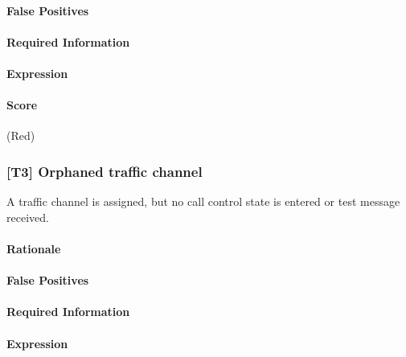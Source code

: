 \documentclass[a4paper,11pt,notitlepage,bigheadings,oneside]{scrartcl}
\begin{document}
\TBD{}

\paragraph{False Positives}

\TBD{}

\paragraph{Required Information}

\TBD{}

\paragraph{Expression}

\TBD{}

\paragraph{Score}

\TBD{} (Red)

\subsubsection{[T3] Orphaned traffic channel}

A traffic channel is assigned, but no call control state is entered or test
message received.

\paragraph{Rationale}

\TBD{}

\paragraph{False Positives}

\TBD{}

\paragraph{Required Information}

\TBD{}

\paragraph{Expression}

\TBD{}
\end{document}
